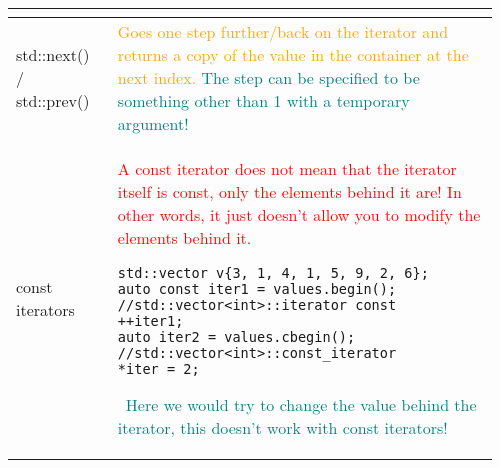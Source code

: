 \documentclass[main.tex,fontsize=8pt,paper=a4,paper=portrait,DIV=calc,]{scrartcl}
\begin{document}
\begin{table}[ht!]
\begin{tabular}{|m{0.2\linewidth}|m{0.755\linewidth}|}
\begin{itemize}
\vspace{-2mm}
\end{itemize} \\
\hline
std::next() / std::prev() & 
\textcolor{orange}{Goes one step further/back on the iterator and returns a copy of the value in the container at the next index.}\newline
\textcolor{teal}{The step can be specified to be something other than 1 with a temporary argument!}\\
\hline
const iterators & 
\textcolor{red}{A const iterator does not mean that the iterator itself is const, only the elements behind it are! In other words, it just doesn't allow you to modify the elements behind it.}\newline
\begin{lstlisting}
std::vector v{3, 1, 4, 1, 5, 9, 2, 6};
auto const iter1 = values.begin(); //std::vector<int>::iterator const
++iter1;
auto iter2 = values.cbegin(); //std::vector<int>::const_iterator
*iter = 2;
\end{lstlisting}
\, \newline
\textcolor{teal}{Here we would try to change the value behind the iterator, this doesn't work with const iterators!}\\
\hline
\end{tabular}

\end{table}
\end{document}
